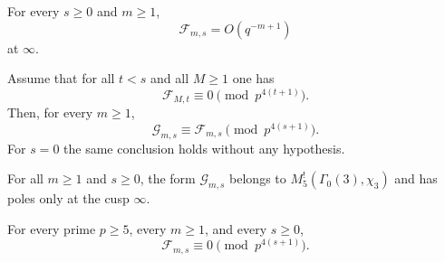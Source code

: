 \documentclass[10pt,a4paper]{amsart}
\newcommand{\G}{\Gamma_0(3)}
\begin{document}
\begin{lemma}\label{lem:sparse-pole}
For every $s\ge0$ and $m\ge1$,
\[
 \mathcal F_{m,s}=O(q^{-m+1})
\]
at $\infty$.
\end{lemma}

\begin{lemma}\label{lem:G-F-comparison}
Assume that for all $t<s$ and all $M\ge1$ one has
\[
 \mathcal F_{M,t}\equiv0\pmod {p^{4(t+1)}}.
\]
Then, for every $m\ge1$,
\[
 \mathcal G_{m,s}\equiv \mathcal F_{m,s}\pmod {p^{4(s+1)}}.
\]
For $s=0$ the same conclusion holds without any hypothesis.
\end{lemma}

\begin{lemma}\label{lem:G-cusps}
For all $m\ge1$ and $s\ge0$, the form $\mathcal G_{m,s}$ belongs to $M_5^!(\G,\chi_3)$ and has poles only at the cusp $\infty$.
\end{lemma}

\begin{theorem}\label{thm:sparse-tower}
For every prime $p\ge5$, every $m\ge1$, and every $s\ge0$,
\[
 \mathcal F_{m,s}\equiv0\pmod {p^{4(s+1)}}.
\]
\end{theorem}
\end{document}
